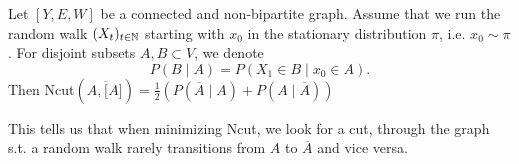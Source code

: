 \begin{theorem}\label{thm:2.25}
    Let $[Y,E,W]$ be a connected and non-bipartite graph. Assume that we run the random walk 
    $(X_t)_{t\in \mathbb{N}}$ starting with $x_0$ in the stationary distribution $\pi$, i.e. $x_0\sim\pi$. For disjoint subsets $A,B\subset V$, we denote 
    \[P(B\mid A)=P(X_1\in B\mid x_0\in A).\]
    Then Ncut$(A,\overline[A])=\frac{1}{2}\left(P(\overline{A}\mid A)+P(A\mid \overline{A})\right)$
\end{theorem}

This tells us that when minimizing Ncut, we look for a cut, through the graph s.t. a random walk rarely transitions 
from $A$ to $\overline{A}$ and vice versa.